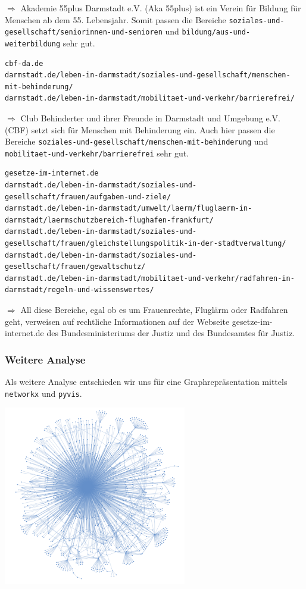 \noindent$\Rightarrow$ Akademie 55plus Darmstadt e.V. (Aka 55plus) ist ein Verein für Bildung für Menschen ab dem 55. Lebensjahr. Somit passen die Bereiche \texttt{soziales-und-gesellschaft/seniorinnen-und-senioren} und \texttt{bildung/aus-und-weiterbildung} sehr gut.

{\color{MidnightBlue}
\begin{lstlisting}
cbf-da.de
darmstadt.de/leben-in-darmstadt/soziales-und-gesellschaft/menschen-mit-behinderung/
darmstadt.de/leben-in-darmstadt/mobilitaet-und-verkehr/barrierefrei/
\end{lstlisting}}

\noindent$\Rightarrow$ Club Behinderter und ihrer Freunde in Darmstadt und Umgebung e.V. (CBF) setzt sich für Menschen mit Behinderung ein. Auch hier passen die Bereiche \texttt{soziales-und-gesellschaft/menschen-mit-behinderung} und \texttt{mobilitaet-und-verkehr/barrierefrei} sehr gut.

{\color{MidnightBlue}
\begin{lstlisting}
gesetze-im-internet.de
darmstadt.de/leben-in-darmstadt/soziales-und-gesellschaft/frauen/aufgaben-und-ziele/
darmstadt.de/leben-in-darmstadt/umwelt/laerm/fluglaerm-in-darmstadt/laermschutzbereich-flughafen-frankfurt/
darmstadt.de/leben-in-darmstadt/soziales-und-gesellschaft/frauen/gleichstellungspolitik-in-der-stadtverwaltung/
darmstadt.de/leben-in-darmstadt/soziales-und-gesellschaft/frauen/gewaltschutz/
darmstadt.de/leben-in-darmstadt/mobilitaet-und-verkehr/radfahren-in-darmstadt/regeln-und-wissenswertes/
\end{lstlisting}}

\noindent$\Rightarrow$ All diese Bereiche, egal ob es um Frauenrechte, Fluglärm oder Radfahren geht, verweisen auf rechtliche Informationen auf der Webseite gesetze-im-internet.de des Bundesministeriums der Justiz und des Bundesamtes für Justiz.

\subsubsection*{Weitere Analyse}

Als weitere Analyse entschieden wir uns für eine Graphrepräsentation mittels \texttt{networkx} und \texttt{pyvis}.

\begin{center}
\includegraphics[width=0.6\textwidth]{images/DarmstadtSpiderGraph.png}
\end{center}

